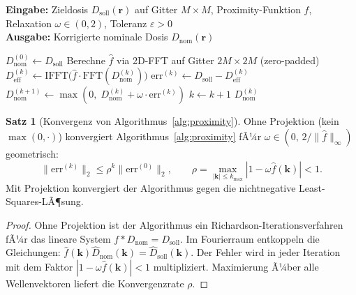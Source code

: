 ﻿\documentclass[a4paper,12pt]{article}
\theoremstyle{definition}
\newtheorem{satz}{Satz}[section]
\newcommand{\ordre}[1]{\mathcal{O}\!\left(#1\right)}
\newcommand{\vect}[1]{\bm{#1}}
\begin{document}
	\begin{algorithm}[htb]
		\caption{Iterative Proximity-Effekt-Korrektur (IPEC)}
		\label{alg:proximity}
		\textbf{Eingabe:} Zieldosis $D_\mathrm{soll}(\vect{r})$ auf Gitter
		$M\times M$, Proximity-Funktion $f$, Relaxation $\omega \in (0, 2)$,
		Toleranz $\varepsilon > 0$\\
		\textbf{Ausgabe:} Korrigierte nominale Dosis $D_\mathrm{nom}(\vect{r})$
		\begin{algorithmic}[1]
			\State $D_\mathrm{nom}^{(0)} \gets D_\mathrm{soll}$ 
			\State Berechne $\hat{f}$ via 2D-FFT auf Gitter $2M\times 2M$ (zero-padded)
			\Repeat
			\State $D_\mathrm{eff}^{(k)} \gets \mathrm{IFFT}\bigl(\hat{f} \cdot
			\mathrm{FFT}(D_\mathrm{nom}^{(k)})\bigr)$ \Comment{Faltung via FFT, $\ordre{M^2\log M}$}
			\State $\mathrm{err}^{(k)} \gets D_\mathrm{soll} - D_\mathrm{eff}^{(k)}$
			\State $D_\mathrm{nom}^{(k+1)} \gets \max\!\left(0,\;
			D_\mathrm{nom}^{(k)} + \omega\cdot\mathrm{err}^{(k)}\right)$
			\State $k \gets k + 1$
			\State \Return $D_\mathrm{nom}^{(k)}$
		\end{algorithmic}
	\end{algorithm}
	
	\begin{satz}[Konvergenz von Algorithmus~\ref{alg:proximity}]
		\label{satz:ipec-konvergenz}
		Ohne Projektion (kein $\max(0,\cdot)$) konvergiert Algorithmus~\ref{alg:proximity}
		fÃ¼r $\omega \in (0,\, 2/\|\hat{f}\|_\infty)$ geometrisch:
		\begin{equation}
			\|\mathrm{err}^{(k)}\|_2 \leq \rho^k \|\mathrm{err}^{(0)}\|_2,
			\qquad \rho = \max_{|\vect{k}| \leq k_\mathrm{max}} |1 - \omega\hat{f}(\vect{k})| < 1.
			\label{eq:ipec-konvergenz}
		\end{equation}
		Mit Projektion konvergiert der Algorithmus gegen die nichtnegative Least-Squares-LÃ¶sung.
	\end{satz}
	
	\begin{proof}
		Ohne Projektion ist der Algorithmus ein Richardson-Iterationsverfahren
		fÃ¼r das lineare System $f * D_\mathrm{nom} = D_\mathrm{soll}$.
		Im Fourierraum entkoppeln die Gleichungen: $\hat{f}(\vect{k})\hat{D}_\mathrm{nom}(\vect{k}) = \hat{D}_\mathrm{soll}(\vect{k})$.
		Der Fehler wird in jeder Iteration mit dem Faktor $|1-\omega\hat{f}(\vect{k})| < 1$
		multipliziert. Maximierung Ã¼ber alle Wellenvektoren liefert die Konvergenzrate $\rho$.
	\end{proof}
	
\end{document}
